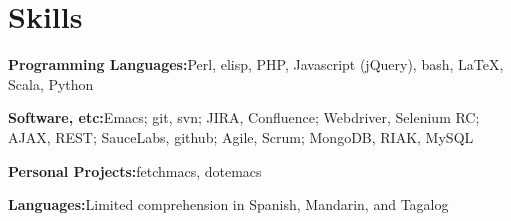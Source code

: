 \section{Skills}
%
\begin{position}
\item[] \textbf{Programming Languages:}\quad Perl, elisp, PHP, Javascript (jQuery), bash, \LaTeX, Scala, Python%
\item[] \textbf{Software, etc:}\quad Emacs; git, svn; JIRA, Confluence; Webdriver, Selenium RC; AJAX, REST; SauceLabs, github; Agile, Scrum; MongoDB, RIAK, MySQL
\item[] \textbf{Personal Projects:}\quad fetchmacs, dotemacs
\item[] \textbf{Languages:}\quad Limited comprehension in Spanish, Mandarin, and Tagalog
\end{position}
